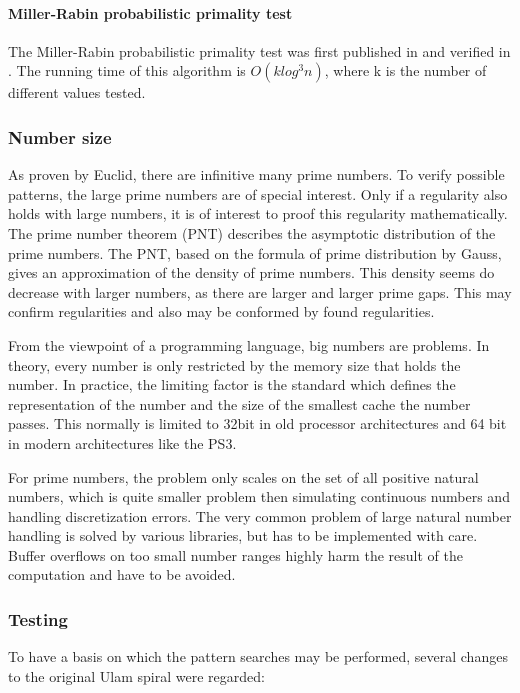 \paragraph{Miller-Rabin probabilistic primality test}
The Miller-Rabin probabilistic primality test was first published in \cite{MRPT} and verified in \cite{MRVer}. The running time of this algorithm is $O(k log^{3} n)$, where k is the number of different values tested.

\subsubsection{Number size}
\label{sec:number_size}
As proven by Euclid, there are infinitive many prime numbers. To verify possible patterns, the large prime numbers are of special interest. Only if a regularity also holds with large numbers, it is of interest to proof this regularity mathematically.
The prime number theorem (PNT) describes the asymptotic distribution of the prime numbers. The PNT, based on the formula of prime distribution by Gauss\cite{XXX}, gives an approximation of the density of prime numbers. This density seems do decrease with larger numbers, as there are larger and larger prime gaps. This may confirm regularities and also may be conformed by found regularities.

From the viewpoint of a programming language, big numbers are problems. In theory, every number is only restricted by the memory size that holds the number. In practice, the limiting factor is the standard which defines the representation of the number and the size of the smallest cache the number passes. This normally is limited to 32bit in old processor architectures and 64 bit in modern architectures like the PS3.

For prime numbers, the problem only scales on the set of all positive natural numbers, which is quite smaller problem then simulating continuous numbers and handling discretization errors. The  very common problem of large natural number handling is solved by various libraries, but has to be implemented with care. Buffer overflows on too small number ranges highly harm the result of the computation and have to be avoided.

\subsubsection{Testing}
\label{sec:tests}
To have a basis on which the pattern searches may be performed, several changes to the original Ulam spiral were regarded:

